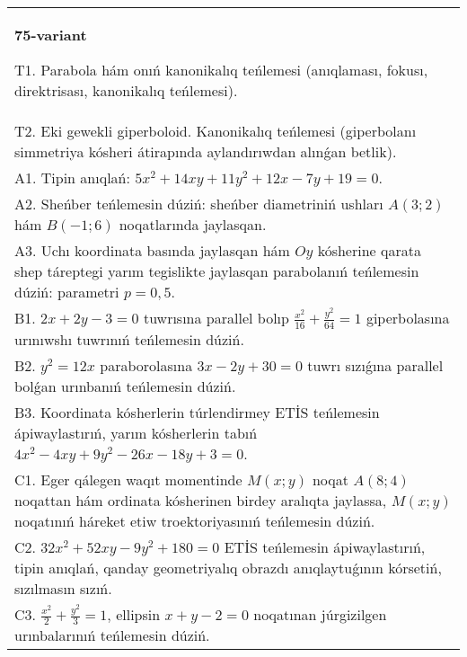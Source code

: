 \documentclass{article}
\begin{document}
\begin{tabular}{m{17cm}}
\textbf{75-variant}
\newline

T1. Parabola hám onıń kanonikalıq teńlemesi (anıqlaması, fokusı, direktrisası, kanonikalıq teńlemesi).\\

T2. Eki gewekli giperboloid. Kanonikalıq teńlemesi (giperbolanı simmetriya kósheri átirapında aylandırıwdan alınǵan betlik).\\

A1. Tipin anıqlań: $5 x^{2}+14 xy+11 y^{2}+12 x-7 y+19=0$.\\

A2. Sheńber teńlemesin dúziń: sheńber diametriniń ushları $A (3;2) $ hám $B (-1;6 ) $ noqatlarında jaylasqan.\\

A3. Uchı koordinata basında jaylasqan hám $Oy$ kósherine qarata shep táreptegi yarım tegislikte jaylasqan parabolanıń teńlemesin dúziń: parametri $p=0,5$.\\

B1. $2x + 2y - 3 = 0$ tuwrısına parallel bolıp $\frac{x^{2}}{16} + \frac{y^{2}}{64} = 1$ giperbolasına urınıwshı tuwrınıń teńlemesin dúziń.  \\

B2. $y^{2} = 12x$ paraborolasına $3x - 2y + 30 = 0$ tuwrı sızıǵına parallel bolǵan urınbanıń teńlemesin dúziń.  \\

B3. Koordinata kósherlerin túrlendirmey ETİS teńlemesin ápiwaylastırıń, yarım kósherlerin tabıń $4x^{2} - 4xy + 9y^{2} - 26x - 18y + 3 = 0$.\\

C1. Eger qálegen waqıt momentinde $M(x;y)$ noqat $A(8;4)$ noqattan hám ordinata kósherinen birdey aralıqta jaylassa, $M(x;y)$ noqatınıń háreket etiw troektoriyasınıń teńlemesin dúziń.  \\

C2. $32x^{2} + 52xy - 9y^{2} + 180 = 0$ ETİS teńlemesin ápiwaylastırıń, tipin anıqlań, qanday geometriyalıq obrazdı anıqlaytuǵının kórsetiń, sızılmasın sızıń.  \\

C3. $\frac{x^{2}}{2} + \frac{y^{2}}{3} = 1$, ellipsin $x + y - 2 = 0$ noqatınan júrgizilgen urınbalarınıń teńlemesin dúziń.  \\

\end{tabular}
\vspace{1cm}
\end{document}
